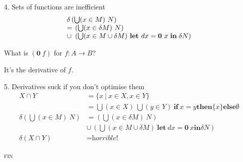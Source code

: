\documentclass[dvipsnames]{beamer}
\newcommand{\mb}{\mathbf}
\newcommand{\setfor}[2]{\{#1 ~|~ #2\}}
\newcommand\kw[1]{\ensuremath{\mathbf{#1}}}
\newcommand\zero{\mb{0}}
\begin{document}
\newcommand\For[1]{{\textstyle\bigcup}(#1)~}

\begin{frame}{4. Sets of functions are inefficient}
  \Large
  \[\setlength\arraycolsep{.2em}\begin{array}{ll}
  \multicolumn{2}{l}{\delta\left(\For{x \in M} N\right)}\\
    =& \left(\For{x \in \delta M} N\right)\\
    \cup& \left(\For{x \in M \cup \delta M}
    \kw{let}~ dx = \zero~x \mathrel{\kw{in}}
    \delta N\right)\\
  \end{array}\]

  \pause\vspace{1em}
  \centering What is $(\zero~f)$ for $f : A \to B$?

  \vspace{.5em} It's the derivative of $f$.
\end{frame}

\begin{frame}{5. Derivatives suck if you don't optimise them}
  \begin{align*}
    X \cap Y
    &= \setfor{x}{x \in X, x \in Y}\\
    &= \textstyle\For{x \in X} \For{y \in Y} \kw{if}~ x = y \mathrel{\kw{then}} \{x\} \mathrel{\kw{else}} \emptyset
    \\[1em]
    {\delta\left(\For{x \in M} N\right)}
    &\textstyle = \left(\For{x \in \delta M} N\right)\\
    &\textstyle \cup \hspace{2pt}\left(\For{x \in M \cup \delta M}
    \kw{let}~ dx = \zero~x \mathrel{\kw{in}}
    \delta N\right)
    \\[1em]
    \delta(X \cap Y) &= \textit{horrible!}
  \end{align*}

\end{frame}


\begin{frame}
  \centering \Huge \scshape fin
\end{frame}
\end{document}

